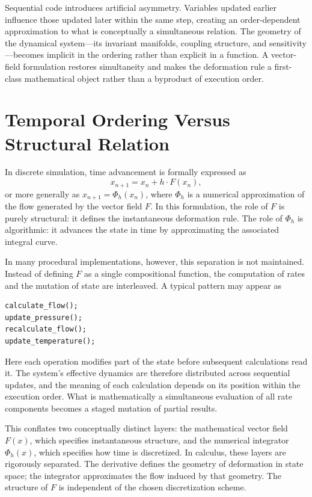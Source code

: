 \documentclass[12pt]{book}
\begin{document}
Sequential code introduces artificial asymmetry. Variables updated earlier influence those updated later within the same step, creating an order-dependent approximation to what is conceptually a simultaneous relation. The geometry of the dynamical system---its invariant manifolds, coupling structure, and sensitivity---becomes implicit in the ordering rather than explicit in a function. A vector-field formulation restores simultaneity and makes the deformation rule a first-class mathematical object rather than a byproduct of execution order.

\section{Temporal Ordering Versus Structural Relation}

In discrete simulation, time advancement is formally expressed as
\[
x_{n+1} = x_n + h \cdot F(x_n),
\]
or more generally as $x_{n+1} = \Phi_h(x_n)$, where $\Phi_h$ is a
numerical approximation of the flow generated by the vector field
$F$. In this formulation, the role of $F$ is purely structural: it
defines the instantaneous deformation rule. The role of $\Phi_h$ is
algorithmic: it advances the state in time by approximating the
associated integral curve.

In many procedural implementations, however, this separation is not
maintained. Instead of defining $F$ as a single compositional
function, the computation of rates and the mutation of state are
interleaved. A typical pattern may appear as

\begin{verbatim}
calculate_flow();
update_pressure();
recalculate_flow();
update_temperature();
\end{verbatim}

Here each operation modifies part of the state before subsequent
calculations read it. The system's effective dynamics are therefore
distributed across sequential updates, and the meaning of each
calculation depends on its position within the execution order. What
is mathematically a simultaneous evaluation of all rate components
becomes a staged mutation of partial results.

This conflates two conceptually distinct layers: the mathematical
vector field $F(x)$, which specifies instantaneous structure, and the
numerical integrator $\Phi_h(x)$, which specifies how time is
discretized. In calculus, these layers are rigorously separated. The
derivative defines the geometry of deformation in state space; the
integrator approximates the flow induced by that geometry. The
structure of $F$ is independent of the chosen discretization scheme.
\end{document}
